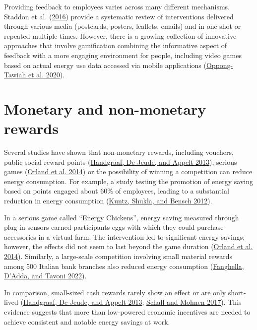\documentclass[
  11pt,
  captions=heading]{scrreport}
\begin{document}
Providing feedback to employees varies across many different mechanisms.
Staddon et al. (\protect\hyperlink{ref-staddon2016intervening}{2016})
provide a systematic review of interventions delivered through various
media (postcards, posters, leaflets, emails) and in one shot or repeated
multiple times. However, there is a growing collection of innovative
approaches that involve gamification combining the informative aspect of
feedback with a more engaging environment for people, including video
games based on actual energy use data accessed via mobile applications
(\protect\hyperlink{ref-oppong2020developing}{Oppong-Tawiah et al.
2020}).

\hypertarget{monetary-and-non-monetary-rewards}{%
\section{Monetary and non-monetary
rewards}\label{monetary-and-non-monetary-rewards}}

Several studies have shown that non-monetary rewards, including
vouchers, public social reward points
(\protect\hyperlink{ref-handgraaf2013public}{Handgraaf, De Jeude, and
Appelt 2013}), serious games
(\protect\hyperlink{ref-orland2014saving}{Orland et al. 2014}) or the
possibility of winning a competition can reduce energy consumption. For
example, a study testing the promotion of energy saving based on points
engaged about 60\% of employees, leading to a substantial reduction in
energy consumption (\protect\hyperlink{ref-kuntz2012many}{Kuntz, Shukla,
and Bensch 2012}).

In a serious game called ``Energy Chickens'', energy saving measured
through plug-in sensors earned participants eggs with which they could
purchase accessories in a virtual farm. The intervention led to
significant energy savings; however, the effects did not seem to last
beyond the game duration
(\protect\hyperlink{ref-orland2014saving}{Orland et al. 2014}).
Similarly, a large-scale competition involving small material rewards
among 500 Italian bank branches also reduced energy consumption
(\protect\hyperlink{ref-fanghella2022evaluating}{Fanghella, D'Adda, and
Tavoni 2022}).

In comparison, small-sized cash rewards rarely show an effect or are
only short-lived (\protect\hyperlink{ref-handgraaf2013public}{Handgraaf,
De Jeude, and Appelt 2013};
\protect\hyperlink{ref-schall2017incentivizing}{Schall and Mohnen
2017}). This evidence suggests that more than low-powered economic
incentives are needed to achieve consistent and notable energy savings
at work.
\end{document}
